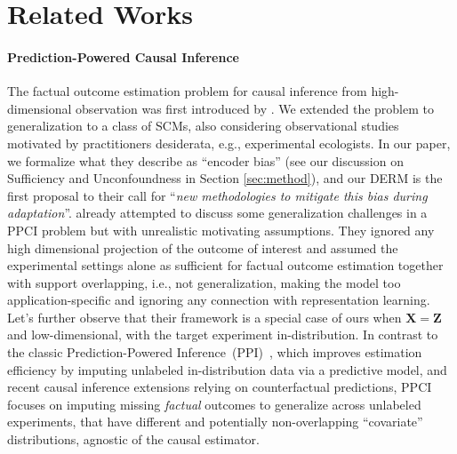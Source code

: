\section{Related Works}
\label{sec:relatedwork}

\paragraph{Prediction-Powered Causal Inference}
The factual outcome estimation problem for causal inference from high-dimensional observation was first introduced by \citet{cadei2024smoke}. We extended the problem to generalization to a class of SCMs, also considering observational studies motivated by practitioners desiderata, e.g., experimental ecologists. In our paper, we formalize what they describe as ``encoder bias'' (see our discussion on Sufficiency and Unconfoundness in Section \ref{sec:method}), and our DERM is the first proposal to their call for ``\textit{new methodologies to mitigate this bias during adaptation}''.
\citet{demirel2024prediction} already attempted to discuss some generalization challenges in a PPCI problem but with unrealistic motivating assumptions. They ignored any high dimensional projection of the outcome of interest and assumed the experimental settings alone as sufficient for factual outcome estimation together with support overlapping, i.e., not generalization, making the model too application-specific and ignoring any connection with representation learning. Let's further observe that their framework is a special case of ours when $\bm{X}=\bm{Z}$ and low-dimensional, with the target experiment in-distribution. In contrast to the classic Prediction-Powered Inference~(PPI)~\citep{angelopoulos2023prediction,angelopoulos2023ppi++}, which improves estimation efficiency by imputing unlabeled in-distribution data via a predictive model, and recent causal inference extensions \citep{de2025efficient,poulet2025prediction} relying on counterfactual predictions, PPCI focuses on imputing missing \textit{factual} outcomes to generalize across unlabeled experiments, that have different and potentially non-overlapping ``covariate'' distributions, agnostic of the causal estimator. 

